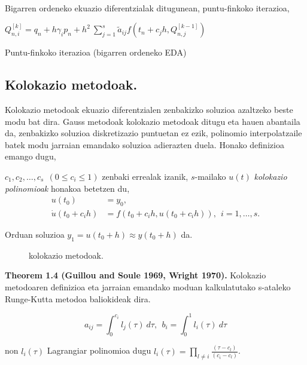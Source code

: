 \paragraph*{}Bigarren ordeneko ekuazio diferentzialak ditugunean, puntu-finkoko iterazioa,

\begin{algorithm}[H]
  {
   $Q_{n,i}^{[k]}=q_{n}+h \gamma_i p_{n}+ h^2 \ \sum\limits_{j=1}^{s} \tilde{a}_{ij} f(t_n+c_jh,Q_{n,j}^{[k-1]}) $\;  
  }
 \caption{Puntu-finkoko iterazioa (bigarren ordeneko EDA)}
\end{algorithm} 
 

\subsection{Kolokazio metodoak.}

Kolokazio metodoak ekuazio diferentzialen zenbakizko soluzioa azaltzeko beste modu bat dira. Gauss metodoak kolokazio metodoak ditugu eta hauen abantaila da, zenbakizko soluzioa diskretizazio puntuetan ez ezik, polinomio interpolatzaile batek modu jarraian emandako soluzioa adierazten duela. Honako definizioa emango dugu,

\begin{definizioa}
$c_1,c_2,\dots,c_s \ \ (0\leq c_i \leq 1)$ zenbaki errealak izanik, $s$-mailako $u(t)$  \emph{kolokazio polinomioak} honakoa betetzen du,
\begin{align*}
u(t_0) &=y_0, \\
\dot{u}(t_0+c_ih) &=f(t_0+c_i h, u(t_0+c_i h)), \ \ i=1,\dots,s.
\end{align*}

Orduan soluzioa $y_1=u(t_0+h)\approx y(t_0+h)$ da.
\end{definizioa}

\begin{figure}[h]
\centering
{}
\caption{ \small kolokazio metodoak.}
\label{fig:kolokazio metodoak}
\end{figure}

\begin{teorema}
\textbf{Theorem 1.4 (Guillou and Soule 1969, Wright 1970).}
Kolokazio metodoaren definizioa eta jarraian emandako moduan kalkulatutako s-ataleko Runge-Kutta metodoa baliokideak dira.

\begin{equation}
a_{ij}=\int_{0}^{c_i} l_j(\tau) \ d\tau, \ \ b_i=\int_{0}^{1} l_i(\tau) \ d\tau
\end{equation}

non $l_i(\tau)$ Lagrangiar polinomioa dugu $l_i(\tau)=\prod_{l\neq i} \frac{(\tau-c_l)}{(c_i-c_l)}$.
\end{teorema}


